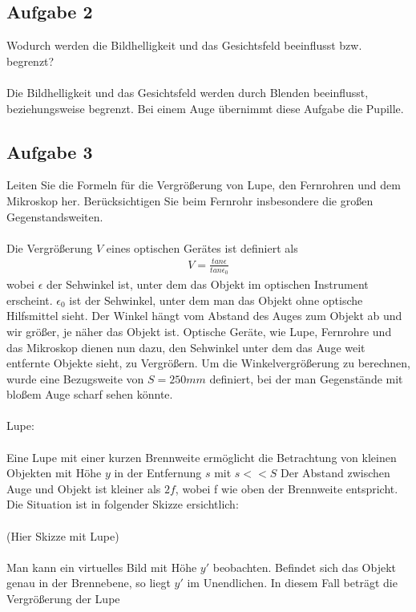 \documentclass[a4paper,10pt]{scrartcl}
\begin{document}
		\subsection{Aufgabe 2}
			Wodurch werden die Bildhelligkeit und das Gesichtsfeld beeinflusst bzw. begrenzt?\\
			\\
			Die Bildhelligkeit und das Gesichtsfeld werden durch Blenden beeinflusst, beziehungsweise begrenzt. Bei einem Auge übernimmt diese Aufgabe die Pupille.
			
		\subsection{Aufgabe 3}
			Leiten Sie die Formeln für die Vergrößerung von Lupe, den Fernrohren und dem Mikroskop
			her. Berücksichtigen Sie beim Fernrohr insbesondere die großen Gegenstandsweiten.\\
			\\
			Die Vergrößerung \(V\) eines optischen Gerätes ist definiert als
			\begin{align*}
			V=\frac{tan\epsilon}{tan\epsilon_{0}}
			\end{align*}	
			wobei \(\epsilon\) der Sehwinkel ist, unter dem das Objekt im optischen Instrument erscheint. \(\epsilon_{0}\) ist der Sehwinkel, unter dem man das Objekt ohne optische Hilfsmittel sieht. Der Winkel hängt vom Abstand des Auges zum Objekt ab und wir größer, je näher das Objekt ist. Optische Geräte, wie Lupe, Fernrohre und das Mikroskop dienen nun dazu, den Sehwinkel unter dem das Auge weit entfernte Objekte sieht, zu Vergrößern. Um die Winkelvergrößerung zu berechnen, wurde eine Bezugsweite von \(S=250mm\) definiert, bei der man Gegenstände mit bloßem Auge scharf sehen könnte.\\
			\\
			Lupe:\\
			\\
			Eine Lupe mit einer kurzen Brennweite ermöglicht die Betrachtung von kleinen Objekten mit Höhe \(y\) in der Entfernung \(s\) mit \(s<<S\) Der Abstand zwischen Auge und Objekt ist kleiner als \(2f\), wobei f wie oben der Brennweite entspricht. Die Situation ist in folgender Skizze ersichtlich:\\
			\\
			(Hier Skizze mit Lupe)\\
			\\
			Man kann ein virtuelles Bild mit Höhe \(y'\) beobachten. Befindet sich das Objekt genau in der Brennebene, so liegt \(y'\) im Unendlichen. In diesem Fall beträgt die Vergrößerung der Lupe
\end{document}
